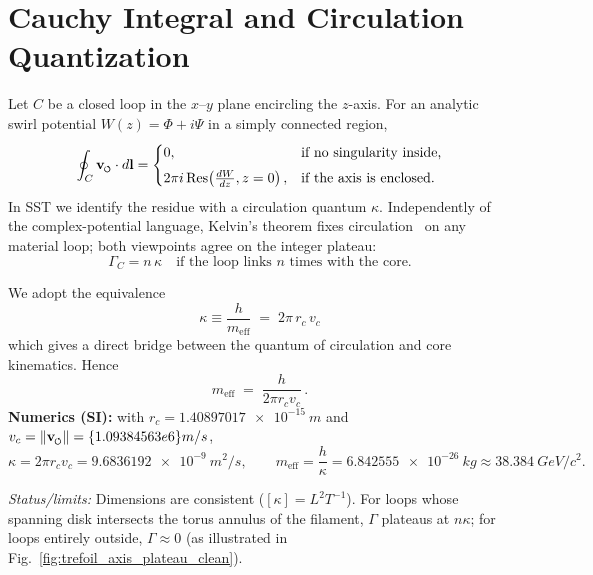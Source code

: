 \documentclass[11pt]{article}
\newcommand{\swirlarrow}{%
    \mathchoice{\mkern-2mu\scriptstyle\boldsymbol{\circlearrowleft}}%
    {\mkern-2mu\scriptstyle\boldsymbol{\circlearrowleft}}%
    {\mkern-2mu\scriptscriptstyle\boldsymbol{\circlearrowleft}}%
    {\mkern-2mu\scriptscriptstyle\boldsymbol{\circlearrowleft}}%
}
\newcommand{\vswirl}{\mathbf{v}_{\swirlarrow}}
\begin{document}
\section{Cauchy Integral and Circulation Quantization}
    Let $C$ be a closed loop in the $x$–$y$ plane encircling the $z$-axis. For an analytic swirl potential $W(z)=\Phi+i\Psi$ in a simply connected region,
    \begin{equation}
        \oint_C \vswirl \cdot d\mathbf{l} =
        \begin{cases}
            0, & \text{if no singularity inside,}\\[4pt]
            2\pi i\, \mathrm{Res}\!\left(\frac{dW}{dz}, z=0\right), & \text{if the axis is enclosed.}
        \end{cases}\label{eq:cauchy-circulation}
    \end{equation}
    In SST we identify the residue with a circulation quantum $\kappa$. Independently of the complex-potential language, Kelvin’s theorem fixes circulation~\cite{helmholtz1858,kelvin1869,Saffman1992,MajdaBertozzi2002} on any material loop; both viewpoints agree on the integer plateau:
    \begin{equation}
        \Gamma_C = n\,\kappa \quad \text{if the loop links $n$ times with the core.}
        \label{eq:circulation-quantization}
    \end{equation}

    \begin{tcolorbox}[title=\textbf{Canonical identification of $\kappa$ (SST)}]
        We adopt the equivalence
        \[
            \boxed{\;\kappa \equiv \frac{h}{m_{\text{eff}}} \;=\; 2\pi\, r_c\, v_c\;}
        \]
        which gives a direct bridge between the quantum of circulation and core kinematics. Hence
        \[
            m_{\text{eff}} \;=\; \frac{h}{2\pi r_c v_c}\,.
        \]
        \textbf{Numerics (SI):} with $r_c=\qty{1.40897017e-15}{m}$ and $v_c=\lVert \mathbf{v}_{\swirlarrow}\rVert=\qty{1.09384563e6}{m/s}$,
        \[
            \kappa=2\pi r_c v_c=\qty{9.6836192e-9}{m^2/s},\qquad
            m_{\text{eff}}=\frac{h}{\kappa}=\qty{6.842555e-26}{kg}\approx\qty{38.384}{GeV/c^2}.
        \]
    \end{tcolorbox}

    \noindent\emph{Status/limits:} Dimensions are consistent ($[\kappa]=L^2T^{-1}$). For loops whose spanning disk intersects the torus annulus of the filament, $\Gamma$ plateaus at $n\kappa$; for loops entirely outside, $\Gamma\approx 0$ (as illustrated in Fig.~\ref{fig:trefoil_axis_plateau_clean}).
\end{document}
